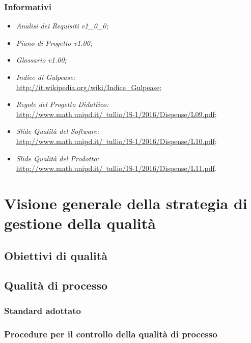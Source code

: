 		\subsubsection{Informativi}
		\begin{itemize}
			\item \textit{Analisi dei Requisiti v1_0_0;}
			\item \textit{Piano di Progetto v1.00;}
			\item \textit{Glossario v1.00;}
			\item \textit{Indice di Gulpease:}
			\\ \href{http://it.wikipedia.org/wiki/Indice_Gulpease}{http://it.wikipedia.org/wiki/Indice_Gulpease};
			\item \textit{Regole del Progetto Didattico:}
			\\ \href{http://www.math.unipd.it/~tullio/IS-1/2016/Dispense/L09.pdf}{http://www.math.unipd.it/~tullio/IS-1/2016/Dispense/L09.pdf};
			\item \textit{Slide Qualità del Software:}
			\\ \href{http://www.math.unipd.it/~tullio/IS-1/2016/Dispense/L10.pdf}{http://www.math.unipd.it/~tullio/IS-1/2016/Dispense/L10.pdf};
			\item \textit{Slide Qualità del Prodotto:}
			\\ \href{http://www.math.unipd.it/~tullio/IS-1/2016/Dispense/L11.pdf}{http://www.math.unipd.it/~tullio/IS-1/2016/Dispense/L11.pdf}.
		\end{itemize}
\newpage
\section{Visione generale della strategia di gestione della qualità}
	\subsection{Obiettivi di qualità}
	\subsection{Qualità di processo}
		\subsubsection{Standard adottato}
		\subsubsection{Procedure per il controllo della qualità di processo}

